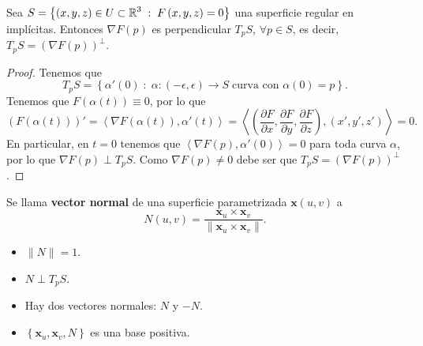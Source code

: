 \begin{prop}
	Sea $\displaystyle S = \left\{ \left(x,y,z\right)\in U\subset \mathbb{R}^{3} \; : \; F\left(x,y,z\right)=0\right\}  $ una superficie regular en implícitas. Entonces $\displaystyle \nabla F\left(p\right) $ es perpendicular $\displaystyle T_{p}S $, $\displaystyle \forall p \in S $, es decir, $\displaystyle T_{p}S = \left(\nabla F\left(p\right)\right)^{\perp} $. 
\end{prop}
\begin{proof}
Tenemos que 
\[T_{p}S = \left\{ \alpha'\left(0\right) \; : \; \alpha : \left(-\epsilon , \epsilon \right)\to S \; \text{curva con } \alpha\left(0\right)=p\right\}  .\]
Tenemos que $\displaystyle F\left(\alpha\left(t\right)\right)\equiv 0 $, por lo que 
\[\left(F\left(\alpha\left(t\right)\right)\right)' = \left\langle \nabla F\left(\alpha\left(t\right)\right), \alpha'\left(t\right) \right\rangle = \left\langle \left(\frac{\partial F}{\partial x}, \frac{\partial F}{\partial y}, \frac{\partial F}{\partial z}\right), \left(x', y', z'\right) \right\rangle =0 .\]
En particular, en $\displaystyle t = 0 $ tenemos que $\displaystyle \left\langle \nabla F\left(p\right), \alpha'\left(0\right) \right\rangle =0 $ para toda curva $\displaystyle \alpha  $, por lo que $\displaystyle \nabla F\left(p\right)\perp T_{p}S $. Como $\displaystyle \nabla F\left(p\right)\neq 0 $ debe ser que $\displaystyle T_{p}S = \left(\nabla F\left(p\right)\right)^{\perp } $. 
\end{proof}
\begin{definition}
Se llama \textbf{vector normal} de una superficie parametrizada $\displaystyle \textbf{x} \left(u,v\right) $ a 
\[N\left(u,v\right)=\frac{ \textbf{x} _{u} \times \textbf{x} _{v}}{\| \textbf{x} _{u} \times \textbf{x} _{v}\|} .\]
\end{definition}
\begin{observation}
\begin{itemize}
\item $\displaystyle \|N\| = 1 $. 
\item $\displaystyle N \perp T_{p}S $. 
\item Hay dos vectores normales: $\displaystyle N $ y $\displaystyle -N $.
\item $\displaystyle \left\{ \textbf{x} _{u}, \textbf{x} _{v}, N\right\}  $ es una base positiva. 
\end{itemize}
\end{observation}

